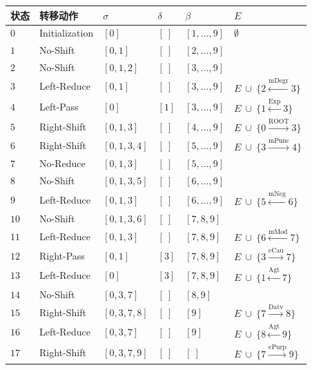 \begin{table}[thbp]
    \vspace{0.5em}\centering\wuhao
	\begin{tabular}{C{3em}L{7em}R{4.5em}C{4em}L{4em}L{9em}}
		\toprule[1.5pt]
		状态 & 转移动作 & $\sigma$ & $\delta$ & $\beta$ & $E$ \\
		\midrule[1pt]
		$0$ & Initialization & $[0]$ & $[\ ]$ & $[1, \dots, 9]$ & $\emptyset $ \\
		$1$ & No-Shift & $[0, 1]$ & $[\ ]$ & $[2, \dots, 9]$ &  \\
		$2$ & No-Shift & $[0, 1, 2]$ & $[\ ]$ & $[3, \dots, 9]$ &  \\
		$3$ & Left-Reduce & $[0, 1]$ & $[\ ]$ & $[3, \dots, 9]$ & $E\ \cup\ \{2\xleftarrow{\textrm{mDegr}}3\}$ \\
		$4$ & Left-Pass & $[0]$ & $[1]$ & $[3, \dots, 9]$ & $E\ \cup\ \{1\xleftarrow{\textrm{Exp}}3\}$ \\
		$5$ & Right-Shift & $[0, 1, 3]$ & $[\ ]$ & $[4, \dots, 9]$ & $E\ \cup\ \{0\xrightarrow{\textrm{ROOT}}3\}$ \\
		$6$ & Right-Shift & $[0, 1, 3, 4]$ & $[\ ]$ & $[5, \dots, 9]$ & $E\ \cup\ \{3\xrightarrow{\textrm{mPunc}}4\}$ \\
		$7$ & No-Reduce & $[0, 1, 3]$ & $[\ ]$ & $[5, \dots, 9]$ &  \\
		$8$ & No-Shift & $[0, 1, 3, 5]$ & $[\ ]$ & $[6, \dots, 9]$ &  \\
		$9$ & Left-Reduce & $[0, 1, 3]$ & $[\ ]$ & $[6, \dots, 9]$ & $E\ \cup\ \{5\xleftarrow{\textrm{mNeg}}6\}$ \\
		$10$ & No-Shift & $[0, 1, 3, 6]$ & $[\ ]$ & $[7, 8, 9]$ &  \\
		$11$ & Left-Reduce & $[0, 1, 3]$ & $[\ ]$ & $[7, 8, 9]$ & $E\ \cup\ \{6\xleftarrow{\textrm{mMod}}7\}$ \\
		$12$ & Right-Pass & $[0, 1]$ & $[3]$ & $[7, 8, 9]$ & $E\ \cup\ \{3\xrightarrow{\textrm{eCau}}7\}$ \\
		$13$ & Left-Reduce & $[0]$ & $[3]$ & $[7, 8, 9]$ & $E\ \cup\ \{1\xleftarrow{\textrm{Agt}}7\}$ \\
		$14$ & No-Shift & $[0, 3, 7]$ & $[\ ]$ & $[8, 9]$ &  \\
		$15$ & Right-Shift & $[0, 3, 7, 8]$ & $[\ ]$ & $[9]$ & $E\ \cup\ \{7\xrightarrow{\textrm{Datv}}8\}$ \\
		$16$ & Left-Reduce & $[0, 3, 7]$ & $[\ ]$ & $[9]$ & $E\ \cup\ \{8\xleftarrow{\textrm{Agt}}9\}$ \\
		$17$ & Right-Shift & $[0, 3, 7, 9]$ & $[\ ]$ & $[\ ]$ & $E\ \cup\ \{7\xrightarrow{\textrm{ePurp}}9\}$ \\
		\bottomrule[1.5pt]
	\end{tabular}
\end{table}

